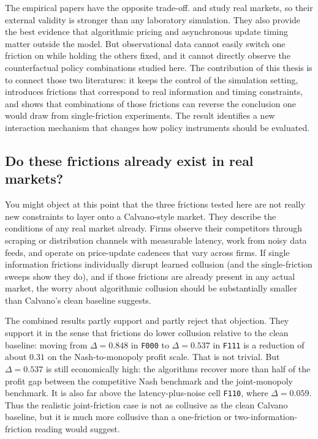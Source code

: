 The empirical papers have the opposite trade-off. \citet{assad2024} and \citet{brown2023} study real markets, so their external validity is stronger than any laboratory simulation. They also provide the best evidence that algorithmic pricing and asynchronous update timing matter outside the model. But observational data cannot easily switch one friction on while holding the others fixed, and it cannot directly observe the counterfactual policy combinations studied here. The contribution of this thesis is to connect those two literatures: it keeps the control of the simulation setting, introduces frictions that correspond to real information and timing constraints, and shows that combinations of those frictions can reverse the conclusion one would draw from single-friction experiments. The result identifies a new interaction mechanism that changes how policy instruments should be evaluated.

\subsection{Do these frictions already exist in real markets?}
\label{sec:discussion-existing-frictions}

You might object at this point that the three frictions tested here are not really new constraints to layer onto a Calvano-style market. They describe the conditions of any real market already. Firms observe their competitors through scraping or distribution channels with measurable latency, work from noisy data feeds, and operate on price-update cadences that vary across firms. If single information frictions individually disrupt learned collusion (and the single-friction sweeps show they do), and if those frictions are already present in any actual market, the worry about algorithmic collusion should be substantially smaller than Calvano's clean baseline suggests.

The combined results partly support and partly reject that objection. They support it in the sense that frictions do lower collusion relative to the clean baseline: moving from $\Delta=0.848$ in \texttt{F000} to $\Delta=0.537$ in \texttt{F111} is a reduction of about $0.31$ on the Nash-to-monopoly profit scale. That is not trivial. But $\Delta=0.537$ is still economically high: the algorithms recover more than half of the profit gap between the competitive Nash benchmark and the joint-monopoly benchmark. It is also far above the latency-plus-noise cell \texttt{F110}, where $\Delta=0.059$. Thus the realistic joint-friction case is not as collusive as the clean Calvano baseline, but it is much more collusive than a one-friction or two-information-friction reading would suggest.

